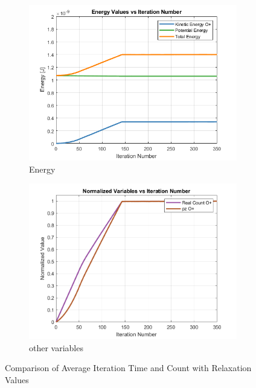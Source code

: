 \begin{figure}[H]
    \centering
    \begin{subfigure}[b]{0.49\linewidth}
        \centering
        \includegraphics[width=\linewidth]{figures/Sphere/energy_values_plot.png}
        \caption{Energy}
        \label{fig:average_iteration_time}
    \end{subfigure}
    \hfill
    \begin{subfigure}[b]{0.49\linewidth}
        \centering
        \includegraphics[width=\linewidth]{figures/Sphere/normalized_variables_plot.png}
        \caption{other variables}
        \label{fig:average_iteration_count}
    \end{subfigure}
    \caption{Comparison of Average Iteration Time and Count with Relaxation Values}
    \label{fig:comparison}
\end{figure}


